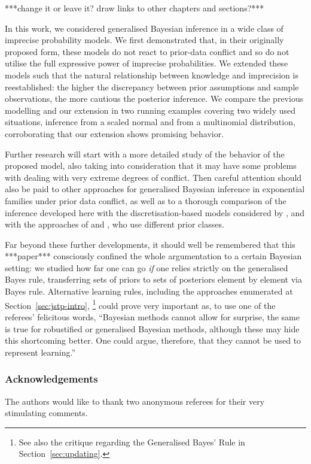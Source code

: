***change it or leave it? draw links to other chapters and sections?***

In this work, we considered generalised Bayesian inference
in a wide class of imprecise probability models. We first
demonstrated that, in their originally proposed form, these models
do not react to prior-data conflict and so do not utilise
the full expressive power of imprecise probabilities. We
extended these models such that the natural relationship between
knowledge and imprecision is reestablished: the higher the
discrepancy between prior assumptions and sample observations, the
more cautious the posterior inference. We compare the previous
modelling and our extension in two running examples covering two
widely used situations, inference from a scaled normal and
from a multinomial distribution, corroborating that our extension
shows promising behavior.

Further research will start with a more detailed study of
the behavior of the proposed model, also taking into consideration
that it may have some problems with dealing with very extreme
degrees of conflict. Then careful attention should also be paid to
other approaches for generalised Bayesian inference in exponential
families \parencite{1993:coolen, 1997:boratynska} under prior data
conflict, as well as to a thorough comparison of the inference
developed here with the discretisation-based models considered by
\textcite{2005:whitcomb}, and with the approaches of \textcite{1991:pericchi}
and \textcite{1994:coolen}, who use different prior classes.

Far beyond these further developments, it should well be
remembered that this ***paper*** consciously confined the whole
argumentation to a certain Bayesian setting: we studied how far
one can go \emph{if} one relies strictly on the generalised Bayes
rule, transferring sets of priors to sets of posteriors element by
element via Bayes rule. Alternative learning
rules, including the approaches enumerated at Section~\ref{sec:jstp-intro},%
\footnote{See also the critique regarding the Generalised Bayes' Rule in Section~\ref{sec:updating}.}
could prove very important as, to use one of the referees'
felicitous words, ``Bayesian methods cannot allow for surprise, the same is
true for robustified or generalised Bayesian methods, although these
may hide this shortcoming better. One could argue, therefore, that
they cannot be used to represent learning.''

\subsubsection*{Acknowledgements}
The authors would like to thank two anonymous referees for their very stimulating comments.



